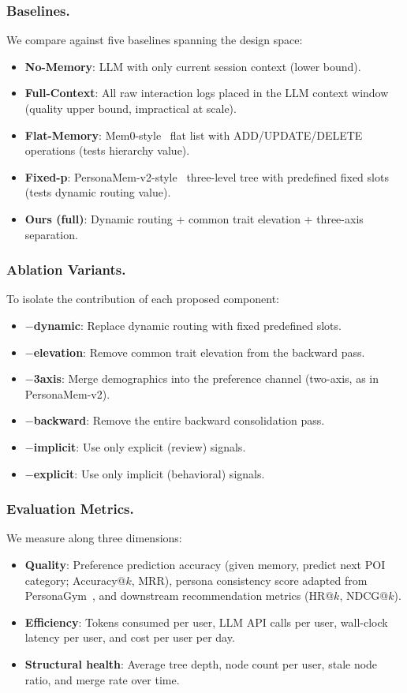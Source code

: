 \documentclass[manuscript,screen,review]{acmart}
\begin{document}
\subsubsection{Baselines.}
We compare against five baselines spanning the design space:
\begin{itemize}
    \item \textbf{No-Memory}: LLM with only current session context (lower bound).
    \item \textbf{Full-Context}: All raw interaction logs placed in the LLM context window (quality upper bound, impractical at scale).
    \item \textbf{Flat-Memory}: Mem0-style~\cite{mem0} flat list with ADD/UPDATE/DELETE operations (tests hierarchy value).
    \item \textbf{Fixed-p}: PersonaMem-v2-style~\cite{personamem-v2} three-level tree with predefined fixed slots (tests dynamic routing value).
    \item \textbf{Ours (full)}: Dynamic routing + common trait elevation + three-axis separation.
\end{itemize}

\subsubsection{Ablation Variants.}
To isolate the contribution of each proposed component:
\begin{itemize}
    \item \textbf{$-$dynamic}: Replace dynamic routing with fixed predefined slots.
    \item \textbf{$-$elevation}: Remove common trait elevation from the backward pass.
    \item \textbf{$-$3axis}: Merge demographics into the preference channel (two-axis, as in PersonaMem-v2).
    \item \textbf{$-$backward}: Remove the entire backward consolidation pass.
    \item \textbf{$-$implicit}: Use only explicit (review) signals.
    \item \textbf{$-$explicit}: Use only implicit (behavioral) signals.
\end{itemize}

\subsubsection{Evaluation Metrics.}
We measure along three dimensions:
\begin{itemize}
    \item \textbf{Quality}: Preference prediction accuracy (given memory, predict next POI category; Accuracy@$k$, MRR), persona consistency score adapted from PersonaGym~\cite{personagym}, and downstream recommendation metrics (HR@$k$, NDCG@$k$).
    \item \textbf{Efficiency}: Tokens consumed per user, LLM API calls per user, wall-clock latency per user, and cost per user per day.
    \item \textbf{Structural health}: Average tree depth, node count per user, stale node ratio, and merge rate over time.
\end{itemize}
\end{document}
